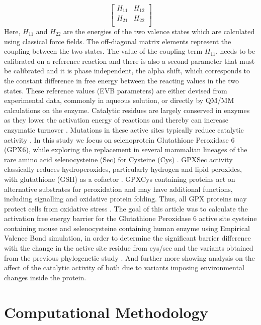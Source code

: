 \documentclass{article}
\begin{document}
\[ 
  \left[ {\begin{array}{cc}
    H_{11} & H_{12} \\
    H_{21} & H_{22} \\
  \end{array} } \right]
\]
Here, $ H_{11} $ and $ H_{22} $ are the energies of the two valence states which are calculated using classical force fields. The off-diagonal matrix elements represent the coupling between the two states.  The value of the coupling term $ H_{11} $, needs to be calibrated on a reference reaction and there is also a second parameter that must be calibrated and it is phase independent, \cite{Oanca2023} the alpha shift, which corresponds to the constant difference in free energy between the reacting values in the two states. \cite{Oanca2023} These reference values (EVB parameters) are either devised from experimental data, commonly in aqueous solution, or directly by QM/MM calculations on the enzyme. 
Catalytic residues are largely conserved in enzymes as they lower the activation energy of reactions and thereby can increase enzymatic turnover \cite{Rees2024}. Mutations in these active sites typically reduce catalytic activity \cite{Rees2024}. In this study we focus on selenoprotein Glutathione Peroxidase 6 (GPX6), while exploring the replacement in several mammalian lineages of the rare amino acid selenocysteine (Sec) for Cysteine (Cys) \cite{Rees2024}. GPXSec activity classically reduces hydroperoxides, particularly hydrogen and lipid peroxides, with glutathione (GSH) as a cofactor \cite{Rees2024}. GPXCys  containing proteins act on alternative substrates for peroxidation and may have additional functions, including signalling and oxidative protein folding. Thus,  all GPX proteins may protect cells from oxidative stress \cite{Rees2024}. The goal of this article was  to calculate the activation free energy barrier for the Glutathione Peroxidase 6 active site cysteine containing mouse and selenocysteine containing human enzyme using Empirical Valence Bond simulation, in order to determine the significant barrier difference with the change in the active site residue from cys/sec and the variants obtained from the previous phylogenetic study \cite{Rees2024}. And further more showing analysis on the affect of the catalytic activity of both due to variants imposing environmental changes inside the protein.  


\section{Computational Methodology}
\end{document}
